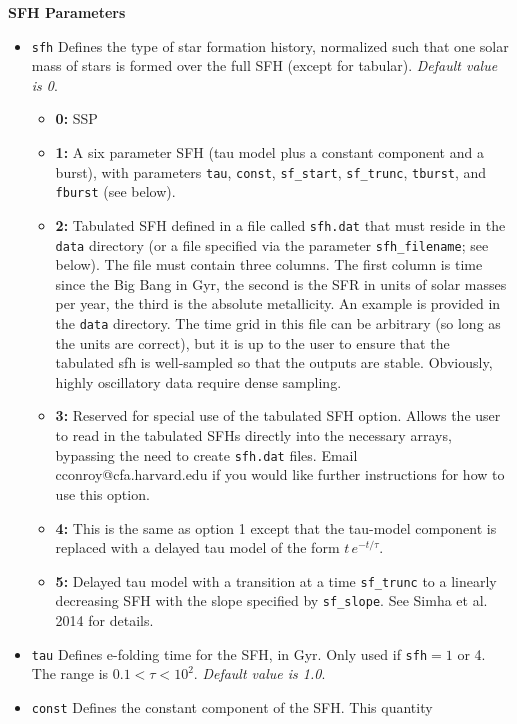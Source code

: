 \documentclass[]{article}
\begin{document}
\noindent
{\bf SFH Parameters}
\begin{itemize}
\item \texttt{sfh} Defines the type of star formation history, normalized such
  that one solar mass of stars is formed over the full SFH (except for tabular).
  {\it Default value is 0}.
  \begin{itemize}
  \item {\bf 0:} SSP
  \item {\bf 1:} A six parameter SFH (tau model plus a constant component and a
    burst), with parameters \texttt{tau}, \texttt{const}, \texttt{sf\_start},
    \texttt{sf\_trunc}, \texttt{tburst}, and \texttt{fburst} (see below).
  \item {\bf 2:} Tabulated SFH defined in a file called \texttt{sfh.dat} that
    must reside in the \texttt{data} directory (or a file specified via the
    parameter \texttt{sfh\_filename}; see below). The file must contain three
    columns.  The first column is time since the Big Bang in Gyr, the second is
    the SFR in units of solar masses per year, the third is the absolute
    metallicity.  An example is provided in the \texttt{data} directory.  The
    time grid in this file can be arbitrary (so long as the units are correct),
    but it is up to the user to ensure that the tabulated sfh is well-sampled so
    that the outputs are stable. Obviously, highly oscillatory data require
    dense sampling.
  \item {\bf 3:} Reserved for special use of the tabulated SFH option. Allows
    the user to read in the tabulated SFHs directly into the necessary arrays,
    bypassing the need to create \texttt{sfh.dat} files.  Email
    cconroy@cfa.harvard.edu if you would like further instructions for how to
    use this option.
  \item {\bf 4:} This is the same as option 1 except that the tau-model
    component is replaced with a delayed tau model of the form $t\,e^{-t/\tau}$.
  \item {\bf 5:} Delayed tau model with a transition at a time
    \texttt{sf\_trunc} to a linearly decreasing SFH with the slope specified by
    \texttt{sf\_slope}. See Simha et al. 2014 for details.
  \end{itemize}
\item{\texttt{tau}} Defines e-folding time for the SFH, in Gyr.  Only used if
  \texttt{sfh}$=1$ or 4.  The range is $0.1<\tau<10^2$.
  {\it Default value is 1.0}.
\item{\texttt{const}} Defines the constant component of the SFH.  This quantity

\end{itemize}
\end{document}

